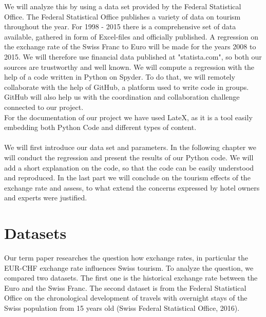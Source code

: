 \documentclass[12pt,a4paper,bibliography=totocnumbered,listof=totocnumbered]{scrartcl}
\begin{document}
We will analyze this by using a data set provided by the Federal Statistical Office. The Federal Statistical Office publishes a variety of data on tourism throughout the year. For 1998 - 2015 there is a comprehensive set of data available, gathered in form of Excel-files and officially published. A regression on the exchange rate of the Swiss Franc to Euro will be made for the years 2008 to 2015. We will therefore use financial data published at "statista.com", so both our sources are trustworthy and well known. We will compute a regression with the help of a code written in Python on Spyder. To do that, we will remotely collaborate with the help of GitHub, a platform used to write code in groups. GitHub will also help us with the coordination and collaboration challenge connected to our project.\\
For the documentation of our project we have used LateX, as it is a tool easily embedding both Python Code and different types of content. \\
\\
We will first introduce our data set and parameters. In the following chapter we will conduct the regression and present the results of our Python code. We will add a short explanation on the code, so that the code can be easily understood and reproduced. In the last part we will conclude on the tourism effects of the exchange rate and assess, to what extend the concerns expressed by hotel owners and experts were justified. 


\newpage


% 
\section{Datasets}



Our term paper researches the question how exchange rates, in particular the EUR-CHF exchange rate influences Swiss tourism. To analyze the question, we compared two datasets. The first one is the historical exchange rate between the Euro and the Swiss Franc. The second dataset is from the Federal Statistical Office on the chronological development of travels with overnight stays of the Swiss population from 15 years old (Swiss Federal Statistical Office, 2016). \\     
\end{document}
